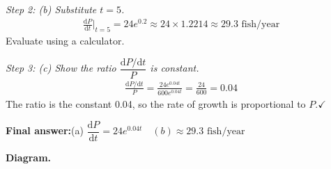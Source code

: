 \documentclass[11pt]{article}
\begin{document}
\textit{Step 2: (b) Substitute \( t = 5 \).}
\[\begin{gathered}
\frac{\mathrm{d}P}{\mathrm{d}t}\bigg|_{t=5} = 24e^{0.2} \approx 24 \times 1.2214 \approx 29.3 \text{ fish/year}
\end{gathered}\]
Evaluate using a calculator.

\textit{Step 3: (c) Show the ratio \( \dfrac{\mathrm{d}P/\mathrm{d}t}{P} \) is constant.}
\[\begin{gathered}
\frac{\mathrm{d}P/\mathrm{d}t}{P} = \frac{24e^{0.04t}}{600e^{0.04t}} = \frac{24}{600} = 0.04
\end{gathered}\]
The ratio is the constant 0.04, so the rate of growth is proportional to \( P \)\(\displaystyle . \checkmark\)

\begin{answerbox}
\textbf{Final answer:}\quad (a) \(\displaystyle  \dfrac{\mathrm{d}P}{\mathrm{d}t} = 24e^{0.04t} \)\(\displaystyle  \quad  (b) \approx 29.3 \text{ fish/year}\)
\end{answerbox}
\textbf{Diagram.}
\end{document}

